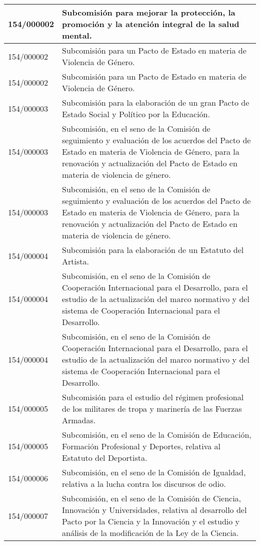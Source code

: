 {\begin{table}[H]
\begin{center}
\begin{tabularx}{\linewidth}{| l | X |}
\hline
154/000002 & Subcomisión para mejorar la protección, la promoción y la atención integral de la salud mental. \\
\hline
154/000002 & Subcomisión para un Pacto de Estado en materia de Violencia de Género. \\
\hline
154/000002 & Subcomisión para un Pacto de Estado en materia de Violencia de Género. \\
\hline
154/000003 & Subcomisión para la elaboración de un gran Pacto de Estado Social y Político por la Educación. \\
\hline
154/000003 & Subcomisión, en el seno de la Comisión de seguimiento y evaluación de los acuerdos del Pacto de Estado en materia de Violencia de Género, para la renovación y actualización del Pacto de Estado en materia de violencia de género. \\
\hline
154/000003 & Subcomisión, en el seno de la Comisión de seguimiento y evaluación de los acuerdos del Pacto de Estado en materia de Violencia de Género, para la renovación y actualización del Pacto de Estado en materia de violencia de género. \\
\hline
154/000004 & Subcomisión para la elaboración de un Estatuto del Artista. \\
\hline
154/000004 & Subcomisión, en el seno de la Comisión de Cooperación Internacional para el Desarrollo, para el estudio de la actualización del marco normativo y del sistema de Cooperación Internacional para el Desarrollo. \\
\hline
154/000004 & Subcomisión, en el seno de la Comisión de Cooperación Internacional para el Desarrollo, para el estudio de la actualización del marco normativo y del sistema de Cooperación Internacional para el Desarrollo. \\
\hline
154/000005 & Subcomisión para el estudio del régimen profesional de los militares de tropa y marinería de las Fuerzas Armadas. \\
\hline
154/000005 & Subcomisión, en el seno de la Comisión de Educación, Formación Profesional y Deportes, relativa al Estatuto del Deportista. \\
\hline
154/000006 & Subcomisión, en el seno de la Comisión de Igualdad, relativa a la lucha contra los discursos de odio. \\
\hline
154/000007 & Subcomisión, en el seno de la Comisión de Ciencia, Innovación y Universidades, relativa al desarrollo del Pacto por la Ciencia y la Innovación y el estudio y análisis de la modificación de la Ley de la Ciencia. \\

\end{tabularx}
\end{center}
\end{table}}
